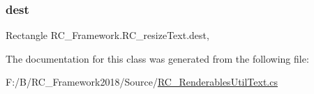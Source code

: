 \subsubsection{\texorpdfstring{dest}{dest}}
{\footnotesize\ttfamily Rectangle R\+C\+\_\+\+Framework.\+R\+C\+\_\+resize\+Text.\+dest\hspace{0.3cm}{\ttfamily [get]}, {\ttfamily [set]}}



The documentation for this class was generated from the following file\+:\begin{DoxyCompactItemize}
\item 
F\+:/\+B/\+R\+C\+\_\+\+Framework2018/\+Source/\mbox{\hyperlink{_r_c___renderables_util_text_8cs}{R\+C\+\_\+\+Renderables\+Util\+Text.\+cs}}\end{DoxyCompactItemize}
